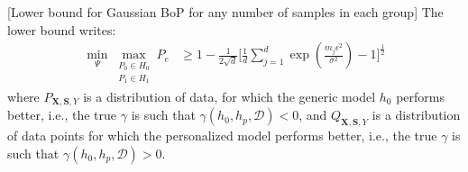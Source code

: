 \begin{corollary}
\label{prop:lower_bound_gaussian}
[Lower bound for Gaussian BoP for any number of samples in each group]
The lower bound writes:
\begin{align*}
      \min _{\Psi} 
    \max _{\substack{P_0 \in H_0 \\ P_1 \in H_1}}
        P_e 
        &\geq 1 - \frac{1}{2\sqrt{d}} 
            \Bigg[
                \frac{1}{d} \sum_{j=1}^d \exp\left(\frac{{m_j}\epsilon^2}{\sigma^2}\right)
                -
                1
                \Bigg]^{\frac{1}{2}}
\end{align*}
where $P_{\mathbf{X}, \mathbf{S}, Y}$ is a distribution of data, for which the generic model $h_0$ performs better, i.e., the true $\gamma$ is such that $\gamma(h_0, h_p, \mathcal{D}) < 0$, and $Q_{\mathbf{X}, \mathbf{S}, Y}$ is a distribution of data points for which the personalized model performs better, i.e., the true $\gamma$ is such that $\gamma(h_0, h_p, \mathcal{D}) > 0$.
\end{corollary}



